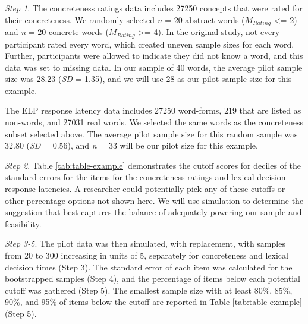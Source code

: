 \documentclass[
  man]{apa7}
\begin{document}
\emph{Step 1}. The concreteness ratings data includes 27250 concepts that were rated for their concreteness. We randomly selected \emph{n} = 20 abstract words (\(M_{Rating}\) \textless= 2) and \emph{n} = 20 concrete words (\(M_{Rating}\) \textgreater= 4). In the original study, not every participant rated every word, which created uneven sample sizes for each word. Further, participants were allowed to indicate they did not know a word, and this data was set to missing data. In our sample of 40 words, the average pilot sample size was 28.23 (\emph{SD} = 1.35), and we will use 28 as our pilot sample size for this example.

The ELP response latency data includes 27250 word-forms, 219 that are listed as non-words, and 27031 real words. We selected the same words as the concreteness subset selected above. The average pilot sample size for this random sample was 32.80 (\emph{SD} = 0.56), and \emph{n} = 33 will be our pilot size for this example.

\emph{Step 2}. Table \ref{tab:table-example} demonstrates the cutoff scores for deciles of the standard errors for the items for the concreteness ratings and lexical decision response latencies. A researcher could potentially pick any of these cutoffs or other percentage options not shown here. We will use simulation to determine the suggestion that best captures the balance of adequately powering our sample and feasibility.

\emph{Step 3-5}. The pilot data was then simulated, with replacement, with samples from 20 to 300 increasing in units of 5, separately for concreteness and lexical decision times (Step 3). The standard error of each item was calculated for the bootstrapped samples (Step 4), and the percentage of items below each potential cutoff was gathered (Step 5). The smallest sample size with at least 80\%, 85\%, 90\%, and 95\% of items below the cutoff are reported in Table \ref{tab:table-example} (Step 5).
\end{document}

